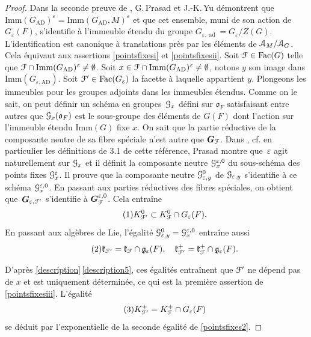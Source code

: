 \documentclass[11pt]{article}
\newcommand{\cf}{cf.\xspace}
\numberwithin{equation}{section}\providecommand{\og}{«\,}\providecommand{\fg}{\,»}
\let\mathcal \EuScript
\let\epsilon\varepsilon
\let\oldS\S
\renewcommand{\S}{\oldS\,}
\newcommand{\frg}{\mathfrak{g}}
\newcommand{\frk}{\mathfrak{k}}
\newcommand{\fro}{\mathfrak{o}}
\newcommand{\AD}{\mathrm{AD}}
\newcommand{\Fac}{\mathrm{Fac}}
\newcommand{\Imm}{\mathrm{Imm}}
\DeclareMathOperator{\ad}{ad}
\newcommand{\bG}{\boldsymbol{G}}
\newcommand{\cA}{\mathcal{A}}
\newcommand{\cF}{\mathcal{F}}
\newcommand{\cG}{\mathcal{G}}
\theoremstyle{plain}
\theoremstyle{definition}
\begin{document}
\begin{proof}
Dans la seconde preuve de \cite[Th.\,1.9]{PY}, G.\,Prasad et J.-K.\,Yu démon\-trent que $\Imm(G_{\AD})^{\epsilon}=\Imm(G_{\AD},M)^{\epsilon}$ et que cet ensemble, muni de son action de $G_{\epsilon}(F)$, s'identifie à l'immeuble étendu du groupe $G_{\epsilon,\ad}=G_{\epsilon}/Z(G)$. L'identification est canonique à translations près par les éléments de $\cA_{M}/\cA_{G}$. Cela équivaut aux assertions \eqref{pointsfixesi} et \eqref{pointsfixesii}. Soit $\cF\in \Fac(G)$ telle que $\cF\cap \Imm(G_{\AD})^{\epsilon}\neq\emptyset$. Soit $x\in \cF\cap \Imm(G_{\AD})^{\epsilon}\neq\emptyset$, notons $y$ son image dans $\Imm(G_{\epsilon,\AD})$. Soit $\cF'\in \Fac(G_{\epsilon})$ la facette à laquelle appartient $y$. Plongeons les immeubles pour les groupes adjoints dans les immeubles étendus. Comme on le sait, on peut définir un schéma en groupes~$\cG_{x}$ défini sur $\fro_{F}$ satisfaisant entre autres que $\cG_{x}(\fro_{F})$ est le sous-groupe des éléments de $G(F)$ dont l'action sur l'immeuble étendu $\Imm(G)$ fixe $x$. On sait que la partie réductive de la composante neutre de sa fibre spéciale n'est autre que $\bG_{\cF}$. Dans \cite[\S3]{P}, \cf en particulier les définitions de 3.1 de cette référence, Prasad montre que~$\epsilon$ agit naturellement sur $\cG_{x}$ et il définit la composante neutre $\cG_{x}^{\epsilon,0}$ du sous-schéma des points fixes $\cG_{x}^{\epsilon}$. Il prouve que la composante neutre $\cG_{\epsilon,y}^{0}$ de $\cG_{\epsilon,y}$ s'identifie à ce schéma $\cG_{x}^{\epsilon,0}$. En passant aux parties réductives des fibres spéciales, on obtient que~$\bG_{\epsilon,\cF'}$ s'identifie à $\bG_{\cF}^{\epsilon,0}$. Cela entraîne
\begin{equation}\tag{1}\label{pointsfixes1}
K_{\cF'}^0\subset K_{\cF}^0\cap G_{\epsilon}(F).
\end{equation}
En passant aux algèbres de Lie, l'égalité $\cG_{\epsilon,y}^{0}=\cG_{x}^{\epsilon,0}$ entraîne aussi
\begin{equation}\tag{2}\label{pointsfixes2}
\frk_{\cF'}=\frk_{\cF}\cap \frg_{\epsilon}(F),\quad \frk^+_{\cF'}=\frk^+_{\cF}\cap \frg_{\epsilon}(F).
\end{equation}

D'après \ref{description}\,\eqref{description5}, ces égalités entraînent que $\cF'$ ne dépend pas de $x$ et est uniquement déterminée, ce qui est la première assertion de \eqref{pointsfixesiii}.
L'égalité
\begin{equation}\tag{3}\label{pointsfixes3}
K_{\cF'}^+=K_{\cF}^+\cap G_{\epsilon}(F)
\end{equation}
se déduit par l'exponentielle de la seconde égalité de \eqref{pointsfixes2}.


\end{proof}
\end{document}
